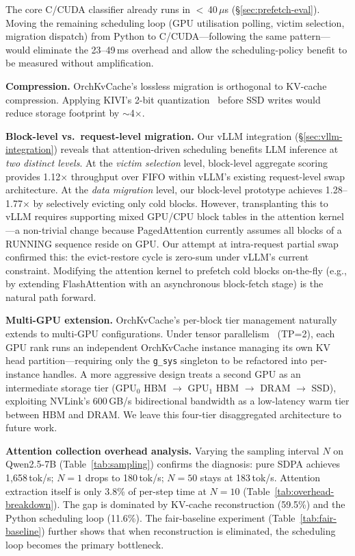 \documentclass[conference]{IEEEtran}
\begin{document}
The core C/CUDA classifier already runs in $<$\,40\,$\mu$s (\S\ref{sec:prefetch-eval}). Moving the remaining scheduling loop (GPU utilisation polling, victim selection, migration dispatch) from Python to C/CUDA---following the same pattern---would eliminate the 23--49\,ms overhead and allow the scheduling-policy benefit to be measured without amplification.

\textbf{Compression.} OrchKvCache's lossless migration is orthogonal to KV-cache compression. Applying KIVI's 2-bit quantization~\cite{kivi} before SSD writes would reduce storage footprint by ${\sim}$4$\times$.

\textbf{Block-level vs.\ request-level migration.}
Our vLLM integration (\S\ref{sec:vllm-integration}) reveals that attention-driven scheduling benefits LLM inference at \emph{two distinct levels}. At the \emph{victim selection} level, block-level aggregate scoring provides 1.12$\times$ throughput over FIFO within vLLM's existing request-level swap architecture. At the \emph{data migration} level, our block-level prototype achieves 1.28--1.77$\times$ by selectively evicting only cold blocks. However, transplanting this to vLLM requires supporting mixed GPU/CPU block tables in the attention kernel---a non-trivial change because PagedAttention currently assumes all blocks of a RUNNING sequence reside on GPU. Our attempt at intra-request partial swap confirmed this: the evict-restore cycle is zero-sum under vLLM's current constraint. Modifying the attention kernel to prefetch cold blocks on-the-fly (e.g., by extending FlashAttention with an asynchronous block-fetch stage) is the natural path forward.

\textbf{Multi-GPU extension.} OrchKvCache's per-block tier management naturally extends to multi-GPU configurations. Under tensor parallelism~\cite{megatron} (TP=2), each GPU rank runs an independent OrchKvCache instance managing its own KV head partition---requiring only the \texttt{g\_sys} singleton to be refactored into per-instance handles. A more aggressive design treats a second GPU as an intermediate storage tier (GPU$_0$ HBM $\to$ GPU$_1$ HBM $\to$ DRAM $\to$ SSD), exploiting NVLink's 600\,GB/s bidirectional bandwidth as a low-latency warm tier between HBM and DRAM. We leave this four-tier disaggregated architecture to future work.

\textbf{Attention collection overhead analysis.}
Varying the sampling interval $N$ on Qwen2.5-7B (Table~\ref{tab:sampling}) confirms the diagnosis: pure SDPA achieves 1,658\,tok/s; $N{=}1$ drops to 180\,tok/s; $N{=}50$ stays at 183\,tok/s. Attention extraction itself is only 3.8\% of per-step time at $N{=}10$ (Table~\ref{tab:overhead-breakdown}).  The gap is dominated by KV-cache reconstruction (59.5\%) and the Python scheduling loop (11.6\%). The fair-baseline experiment (Table~\ref{tab:fair-baseline}) further shows that when reconstruction is eliminated, the scheduling loop becomes the primary bottleneck.
\end{document}
